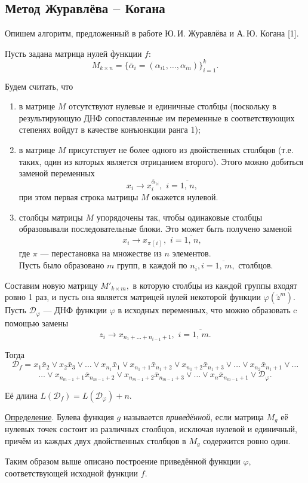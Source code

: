 \documentclass[12pt,a4paper,oneside,fleqn,leqno]{article}
\theoremstyle{definition}
\begin{document}
		\subsection{Метод Журавлёва -- Когана} \label{zhuravlev_kogan}
			Опишем алгоритм, предложенный в работе Ю.\,И. Журавлёва и А.\,Ю. Когана [1].\par
			Пусть задана матрица нулей функции $f:$
			$$
				M_{k \times n} = \{\bar{\alpha}_i = (\alpha_{i1},\ldots,\alpha_{in}) \}_{i = 1}^k.
			$$\par
			Будем считать, что
			\begin{enumerate}
				\item
				в матрице $M$ отсутствуют нулевые и единичные столбцы (поскольку в результирующую ДНФ сопоставленные им переменные в соответствующих степенях войдут в качестве конъюнкции ранга 1);
				\item
				в матрице $M$ присутствует не более одного из двойственных столбцов (т.е. таких, один из которых является отрицанием второго). Этого можно добиться заменой переменных
				$$
					x_i \rightarrow x_i^{\bar{\alpha}_{1i}},\,\,i = \overline{1,\,n},
				$$
				при этом первая строка матрицы $M$ окажется нулевой.
				\item
				столбцы матрицы $M$ упорядочены так, чтобы одинаковые столбцы образовывали последовательные блоки. Это может быть получено заменой
					$$
					x_i \rightarrow x_{\pi(i)},\,\,i = \overline{1,\,n},
				$$
				где $\pi$ --- перестановка на множестве из $n$ элементов.\\
				Пусть было образовано $m$ групп, в каждой по $n_i, i = \overline{1,\,m},$ столбцов.
			\end{enumerate}\par
			Составим новую матрицу $M'_{k \times m},$ в которую столбцы из каждой группы входят ровно 1 раз, и пусть она является матрицей нулей некоторой функции $\varphi(\tilde z^m).$ Пусть $\mathcal{D}_{\varphi}$ --- ДНФ функции $\varphi$ в исходных переменных, что можно образовать c помощью замены
			$$
				z_i \rightarrow x_{n_1 + \ldots + n_{i - 1} + 1},\,\,i = \overline{1,\,m}.
			$$\par
			Тогда
			$$
				\mathcal{D}_f = x_1\bar{x}_2 \vee x_2\bar{x}_3 \vee \ldots \vee x_{n_1}\bar{x}_1 \vee x_{n_1 + 1}\bar{x}_{n_1 + 2} \vee x_{n_1 + 2}\bar{x}_{n_1 + 3} \vee \ldots \vee x_{n_2}\bar{x}_{n_1 + 1} \vee \ldots
			$$
			$$
				\ldots \vee x_{n_{m - 1} + 1}\bar{x}_{n_{m - 1} + 2} \vee x_{n_{m - 1} + 2}\bar{x}_{n_{m - 1} + 3} \vee \ldots \vee x_{n}\bar{x}_{n_{m - 1} + 1} \vee \mathcal{D}_{\varphi}.
			$$\par
			Её длина $L(\mathcal{D}_f) = L(\mathcal{D}_{\varphi}) + n.$\par
			\underline{Определение}. Булева функция $g$ называется {\it приведённой}, если матрица $M_g$ её нулевых точек состоит из различных столбцов, исключая нулевой и единичный, причём из каждых двух двойственных столбцов в $M_g$ содержится ровно один.\par
			Таким образом выше описано построение приведённой функции $\varphi,$ соответствующей исходной функции $f.$
\end{document}

